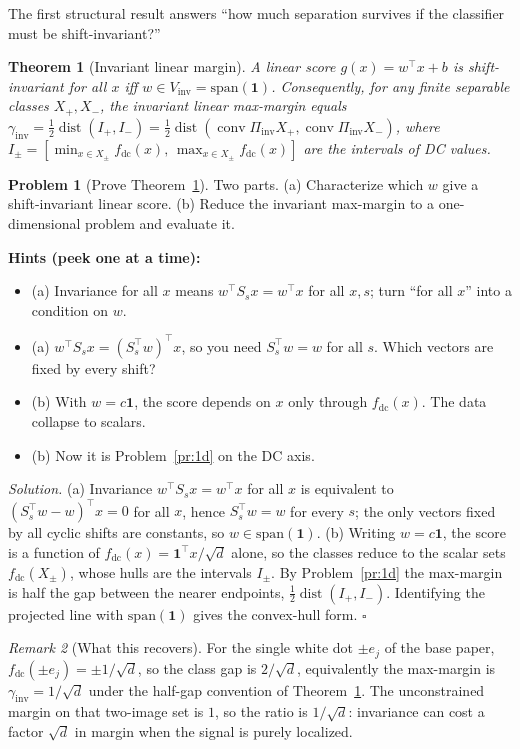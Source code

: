 \documentclass[11pt]{article}
\theoremstyle{plain}
\newtheorem{theorem}{Theorem}[section]
\theoremstyle{definition}
\newtheorem{problem}{Problem}[section]
\theoremstyle{remark}
\newtheorem{remark}[theorem]{Remark}
\newenvironment{hints}{\par\smallskip\noindent\textbf{\color{hintc}Hints (peek one at a time):}\begin{itemize}}{\end{itemize}\par\smallskip}
\newenvironment{solution}{\par\smallskip\noindent\textit{Solution.}\;}{\hfill$\square$\par\smallskip}
\newcommand{\fdc}{f_{\mathrm{dc}}}
\newcommand{\Vinv}{V_{\mathrm{inv}}}
\newcommand{\one}{\mathbf 1}
\newcommand{\Piinv}{\Pi_{\mathrm{inv}}}
\newcommand{\conv}{\operatorname{conv}}
\newcommand{\dist}{\operatorname{dist}}
\begin{document}
The first structural result answers ``how much separation survives if the classifier must be shift-invariant?''

\begin{theorem}[Invariant linear margin]\label{thm:A}
A linear score $g(x)=w^\top x+b$ is shift-invariant for all $x$ iff $w\in\Vinv=\mathrm{span}(\one)$. Consequently,
for any finite separable classes $X_+,X_-$, the invariant linear max-margin equals
$\gamma_{\mathrm{inv}}=\tfrac12\dist(I_+,I_-)=\tfrac12\dist(\conv\Piinv X_+,\conv\Piinv X_-)$, where
$I_\pm=[\min_{x\in X_\pm}\fdc(x),\,\max_{x\in X_\pm}\fdc(x)]$ are the intervals of DC values.
\end{theorem}

\begin{problem}[Prove Theorem~\ref{thm:A}]\label{pr:A}
Two parts. (a) Characterize which $w$ give a shift-invariant linear score. (b) Reduce the invariant max-margin to a
one-dimensional problem and evaluate it.
\end{problem}
\begin{hints}
\item (a) Invariance for all $x$ means $w^\top S_sx=w^\top x$ for all $x,s$; turn ``for all $x$'' into a condition on $w$.
\item (a) $w^\top S_s x=(S_s^\top w)^\top x$, so you need $S_s^\top w=w$ for all $s$. Which vectors are fixed by every shift?
\item (b) With $w=c\one$, the score depends on $x$ only through $\fdc(x)$. The data collapse to scalars.
\item (b) Now it is Problem~\ref{pr:1d} on the DC axis.
\end{hints}
\begin{solution}
(a) Invariance $w^\top S_sx=w^\top x$ for all $x$ is equivalent to $(S_s^\top w-w)^\top x=0$ for all $x$, hence
$S_s^\top w=w$ for every $s$; the only vectors fixed by all cyclic shifts are constants, so $w\in\mathrm{span}(\one)$.
(b) Writing $w=c\one$, the score is a function of $\fdc(x)=\one^\top x/\sqrt d$ alone, so the classes reduce to the
scalar sets $\fdc(X_\pm)$, whose hulls are the intervals $I_\pm$. By Problem~\ref{pr:1d} the max-margin is half the
gap between the nearer endpoints, $\tfrac12\dist(I_+,I_-)$. Identifying the projected line with $\mathrm{span}(\one)$
gives the convex-hull form.
\end{solution}

\begin{remark}[What this recovers]
For the single white dot $\pm e_j$ of the base paper, $\fdc(\pm e_j)=\pm1/\sqrt d$, so the class gap is $2/\sqrt d$,
equivalently the max-margin is $\gamma_{\mathrm{inv}}=1/\sqrt d$ under the half-gap convention of Theorem~\ref{thm:A}.
The unconstrained margin on that two-image set is $1$, so the ratio is $1/\sqrt d$: invariance can cost a factor
$\sqrt d$ in margin when the signal is purely localized.
\end{remark}
\end{document}
